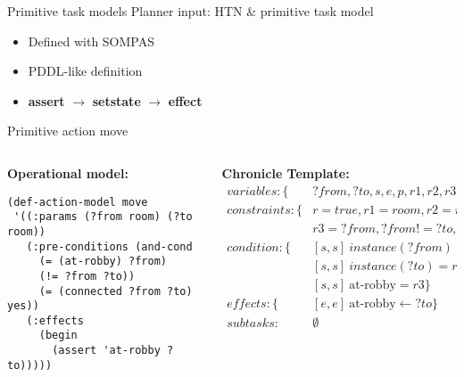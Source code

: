 


\begin{frame}[fragile]{Primitive task models}
    \small
    Planner input: HTN \& primitive task model
    \begin{itemize}
        \item Defined with SOMPAS
        \pause
        \item PDDL-like definition
        \pause
        \item \textbf{assert} $\rightarrow$ \textbf{setstate} $\rightarrow$ \textbf{effect} 
    \end{itemize}
    Primitive action move
    \begin{columns}[T] %
        \begin{column}{.48\textwidth}
            \small
            \textbf{Operational model:}
            \tiny
            \begin{lstlisting}
(def-action-model move
 '((:params (?from room) (?to room))
   (:pre-conditions (and-cond 
     (= (at-robby) ?from)
     (!= ?from ?to))
     (= (connected ?from ?to) yes))
   (:effects
     (begin
       (assert 'at-robby ?to)))))
            \end{lstlisting}
        \end{column}%
        \begin{column}{.48\textwidth}
            \small
            \textbf{Chronicle Template:}
            \tiny
            \begin{align*}
            variables: \{&?from, ?to, s, e, p, r1,r2,r3,r\}\\
            constraints: \{&r = true, r1 = room, r2 = room\\
                & r3 = ?from, ?from != ?to, s < e \}\\
            condition:\{&[s,s]\ instance(?from) = r1 \\
                &[s,s]\ instance(?to) = r2\\
                &[s,s]\ \text{at-robby} = r3 \}\\
            effects:\{&[e,e]\ \text{at-robby} \leftarrow ?to\} \\
            subtasks:& \emptyset
            \end{align*}
        \end{column}
    \end{columns}   
    
\end{frame}



